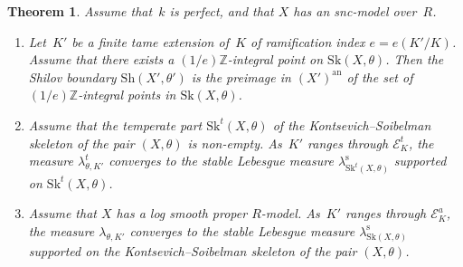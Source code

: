 \documentclass[11pt]{article}
\let\mathcal\mathscr
\newtheorem{theorem}[equation]{Theorem}
\theoremstyle{definition}
\numberwithin{equation}{subsection}
\newcommand{\Z}{\ensuremath{\mathbb{Z}}}
\newcommand{\snc}{\textit{snc}}
\newcommand{\an}{\mathrm{an}}
\newcommand{\Sh}{\mathrm{Sh}}
\newcommand{\Sk}{\mathrm{Sk}}
\newcommand{\rs}{\mathrm{s}}
\let\form\theta
\let\Leb\lambda
\begin{document}
\begin{theorem}\label{thm:main}
Assume that~$k$ is perfect, and that $X$ has an \snc-model over~$R$.
\begin{enumerate}
\item \label{it:maina} Let~$K'$ be a finite tame extension of~$K$ of ramification index $e=e(K'/K)$.
Assume that there exists a $(1/e)\Z$-integral point on $\Sk(X,\form)$.
Then the Shilov boundary $\Sh(X',\form')$ is the preimage in $(X')^{\an}$ of the set of $(1/e)\Z$-integral points in $\Sk(X,\form)$.

\item \label{it:tame}
Assume that the temperate part $\Sk^t(X,\form)$ of the Kontsevich--Soibelman skeleton of the pair $(X,\form)$ is non-empty.
As~$K'$ ranges through $\mathcal{E}^t_K$, the measure $\lambda^t_{\form,K'}$ converges to the stable Lebesgue measure $\Leb^{\rs}_{\Sk^t(X,\form)}$
supported on $\Sk^t(X,\form)$.

\item \label{it:wild} Assume that $X$ has a log smooth proper $R$\nobreakdash-model.
As~$K'$ ranges through $\mathcal{E}^a_K$, the measure $\lambda_{\form,K'}$ converges to the stable Lebesgue measure $\Leb^{\rs}_{\Sk(X,\form)}$
supported on the Kontsevich--Soibelman skeleton of the pair $(X,\form)$.
\end{enumerate}
\end{theorem}
\end{document}
